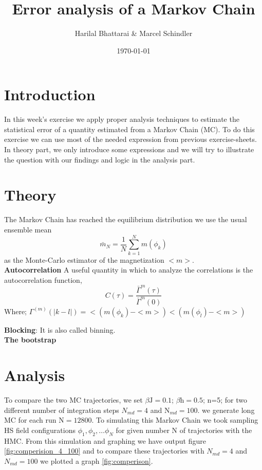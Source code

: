 \documentclass[11pt, a4paper, DIV=12]{scrartcl}
\title{Error analysis of a Markov Chain}
\date{\today}
\author{Harilal Bhattarai \& Marcel Schindler}
\begin{document}
	\maketitle
	
\section{Introduction}
In this week’s exercise we apply proper analysis techniques to estimate the statistical error of a quantity estimated from a Markov Chain (MC). To do this exercise we can use most of the needed expression from previous exercise-sheets. In theory part, we only introduce some expressions and  we will try to illustrate the question with our findings and logic in the analysis part.
\section{Theory}
	The Markov Chain has reached the equilibrium distribution we use the usual ensemble mean
	\begin{equation}
	\bar{m}_{N}= \frac{1}{N}\sum_{k=1}^{N} m(\phi_{k})
	\end{equation}
	as the Monte-Carlo estimator of the magnetization $ <m> $.\\
	
	\textbf{Autocorrelation}
	A useful quantity in which to analyze the correlations is the autocorrelation function,
	\begin{equation}
	C(\tau)= \frac{\bar{\Gamma}^{m}(\tau)}{\bar{\Gamma}^{m}(0)}
	\end{equation}
	Where; 
	$  
	\Gamma^{(m)}(|k -l|)= <(m(\phi_{k}) - <m>) <(m(\phi_{l}) - <m>) $
	
	\textbf{Blocking}: It is also called binning.\\
	\textbf{The bootstrap}
	
\section{Analysis}
To compare the two MC trajectories, we set $\beta \text{J}= 0.1 $; $\beta \text{h}= 0.5 $; n=5; for two different number of integration steps $ N_{md}=4$ and  $\text{N}_{md}= 100 $. we generate long MC for each run $ \text{N}=12800 $. To simulating this Markov Chain we took sampling HS field configurations $ \phi_{1}, \phi_{2}, \dots \phi_{N} $ for given number N of trajectories with the HMC. From this simulation and graphing we have output figure \ref{fig:comperision_4_100} and to compare these trajectories with $ N_{md}=4$ and $ N_{md}=100$ we plotted a graph \ref{fig:comperison}. 
\end{document}
